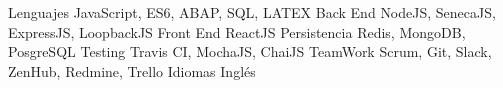 


\begin{cvskills}

\cvskill
{Lenguajes} %
{JavaScript, ES6, ABAP, SQL, LATEX } %
\cvskill
{Back End} %
{NodeJS, SenecaJS, ExpressJS, LoopbackJS} %
\cvskill
{Front End} %
{ReactJS} %
\cvskill
{Persistencia} %
{Redis, MongoDB, PosgreSQL} %
\cvskill
{Testing} %
{Travis CI, MochaJS, ChaiJS} %
\cvskill
{TeamWork} %
{Scrum, Git, Slack, ZenHub, Redmine, Trello} %
\cvskill
{Idiomas} %
{Inglés} %
\end{cvskills}
